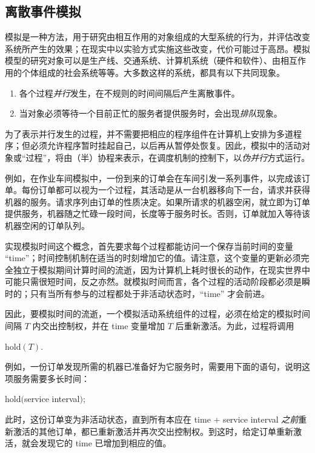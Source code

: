 \subsection{离散事件模拟}

模拟是一种方法，用于研究由相互作用的对象组成的大型系统的行为，并评估改变系统所产生的效果；在现实中以实验方式实施这些改变，代价可能过于高昂。模拟模型的研究对象可以是生产线、交通系统、计算机系统（硬件和软件）、由相互作用的个体组成的社会系统等等。大多数这样的系统，都具有以下共同现象。

\begin{enumerate}[wide, nosep, label=(\arabic*)]
	\item 各个过程\textit{并行}发生，在不规则的时间间隔后产生离散事件。
	\item 当对象必须等待一个目前正忙的服务者提供服务时，会出现\textit{排队}现象。
\end{enumerate}

为了表示并行发生的过程，并不需要把相应的程序组件在计算机上安排为多道程序；但必须允许程序暂时挂起自己，以后再从暂停处恢复。因此，模拟中的活动对象或“过程”，将由（半）协程来表示，在调度机制的控制下，以\textit{伪并行}方式运行。

例如，在作业车间模拟中，一份到来的订单会在车间引发一系列事件，以完成该订单。每份订单都可以视为一个过程，其活动是从一台机器移向下一台，请求并获得机器的服务。请求序列由订单的性质决定。如果所请求的机器空闲，就立即为订单提供服务，机器随之忙碌一段时间，长度等于服务时长。否则，订单就加入等待该机器空闲的订单队列。

实现模拟时间这个概念，首先要求每个过程都能访问一个保存当前时间的变量 ``time''；时间控制机制在适当的时刻增加它的值。请注意，这个变量的更新必须完全独立于模拟期间计算时间的流逝，因为计算机上耗时很长的动作，在现实世界中可能只需很短时间，反之亦然。就模拟时间而言，各个过程的活动阶段都必须是瞬时的；只有当所有参与的过程都处于非活动状态时，``time'' 才会前进。

因此，要模拟时间的流逝，一个模拟活动系统组件的过程，必须在给定的模拟时间间隔 $T$ 内交出控制权，并在 time 变量增加 $T$ 后重新激活。为此，过程将调用

\quad hold$(T)$.

例如，一份订单发现所需的机器已准备好为它服务时，需要用下面的语句，说明这项服务需要多长时间：

\quad hold$($service interval$)$;

\noindent
此时，这份订单变为非活动状态，直到所有本应在 time $+$ service interval \textit{之前}重新激活的其他订单，都已重新激活并再次交出控制权。到这时，给定订单重新激活，就会发现它的 time 已增加到相应的值。

